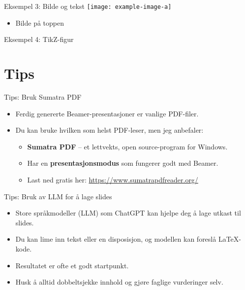 \documentclass{beamer}
\begin{document}
	\begin{frame}{Eksempel 3: Bilde og tekst}
		\centering
		\texttt{[image: example-image-a]}
		\vspace{0.5cm}
		
		\begin{itemize}
			\item Bilde på toppen

		\end{itemize}
	\end{frame}
	
	\begin{frame}{Eksempel 4: TikZ-figur}
	\end{frame}
	
\section{Tips}
	
	\begin{frame}{Tips: Bruk Sumatra PDF}
		\begin{itemize}
			\item Ferdig genererte Beamer-presentasjoner er vanlige PDF-filer.
			\item Du kan bruke hvilken som helst PDF-leser, men jeg anbefaler:
			\begin{itemize}
				\item \textbf{Sumatra PDF} – et lettvekts, open source-program for Windows.
				\item Har en \textbf{presentasjonsmodus} som fungerer godt med Beamer.
				\item Last ned gratis her: \url{https://www.sumatrapdfreader.org/}
			\end{itemize}
		\end{itemize}
	\end{frame}

	\begin{frame}{Tips: Bruk av LLM for å lage slides}
		\begin{itemize}
			\item Store språkmodeller (LLM) som ChatGPT kan hjelpe deg å lage utkast til slides.  
			\item Du kan lime inn tekst eller en disposisjon, og modellen kan foreslå LaTeX-kode.  
			\item Resultatet er ofte et godt startpunkt.
			\item Husk å alltid dobbeltsjekke innhold og gjøre faglige vurderinger selv.  
		\end{itemize}
	\end{frame}

	
\end{document}
